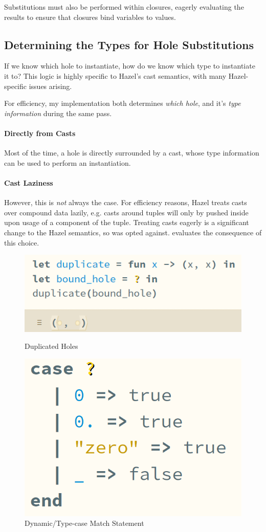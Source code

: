 Substitutions must also be performed within closures, eagerly evaluating the results to ensure that closures bind variables to values. 

\subsection{Determining the Types for Hole Substitutions}
\label{sec:TypesForHoles}
If we know which hole to instantiate, how do we know which type to instantiate it to? This logic is highly specific to Hazel's cast semantics, with many Hazel-specific issues arising.

For efficiency, my implementation both determines \textit{which hole}, and it's \textit{type information} during the same pass.

\paragraph{Directly from Casts}
Most of the time, a hole is directly surrounded by a cast, whose type information can be used to perform an instantiation.

\paragraph{Cast Laziness}\label{sec:CastLaziness}
However, this is \textit{not} always the case. For efficiency reasons, Hazel treats casts over compound data lazily, e.g. casts around tuples will only by pushed inside upon usage of a component of the tuple. Treating casts eagerly is a significant change to the Hazel semantics, so was opted against.  evaluates the consequence of this choice.

\begin{figure}
\centering
\begin{minipage}{.45\textwidth}
\centering
\includegraphics[width=0.8\linewidth]{Media/Figures/duplicate_hole}
\caption{Duplicated Holes}
\label{fig:HoleDuplication}
\end{minipage}%
\begin{minipage}{.45\textwidth}
  \centering
\includegraphics[width=0.5\linewidth]{Media/Figures/dynmatch}
\caption{Dynamic/Type-case Match Statement}
\label{fig:DynamicPatternMatching}
\end{minipage}
\end{figure}

